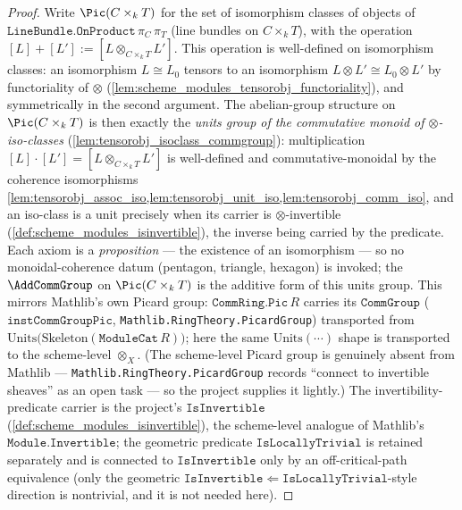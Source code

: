 \begin{proof}
  Write \(\Pic(C \times_k T)\) for the set of isomorphism classes of objects
  of \(\texttt{LineBundle.OnProduct}\,\pi_C\,\pi_T\) (line bundles on
  \(C \times_k T\)), with the operation
  \([L] + [L'] := [L \otimes_{C \times_k T} L']\). This operation is
  well-defined on isomorphism classes: an isomorphism \(L \cong L_0\) tensors
  to an isomorphism \(L \otimes L' \cong L_0 \otimes L'\) by functoriality of
  \(\otimes\) (\cref{lem:scheme_modules_tensorobj_functoriality}), and
  symmetrically in the second argument. The abelian-group structure on
  \(\Pic(C \times_k T)\) is then exactly the \emph{units group of the
  commutative monoid of \(\otimes\)-iso-classes}
  (\cref{lem:tensorobj_isoclass_commgroup}): multiplication
  \([L]\cdot[L'] = [L \otimes_{C\times_k T} L']\) is well-defined and
  commutative-monoidal by the coherence isomorphisms
  \cref{lem:tensorobj_assoc_iso,lem:tensorobj_unit_iso,lem:tensorobj_comm_iso},
  and an iso-class is a unit precisely when its carrier is
  \(\otimes\)-invertible (\cref{def:scheme_modules_isinvertible}), the inverse
  being carried by the predicate. Each axiom is a \emph{proposition} --- the
  existence of an isomorphism --- so no monoidal-coherence datum (pentagon,
  triangle, hexagon) is invoked; the \(\AddCommGroup\) on
  \(\Pic(C \times_k T)\) is the additive form of this units group. This mirrors
  Mathlib's own Picard group: \(\mathtt{CommRing.Pic}\,R\) carries its
  \(\mathtt{CommGroup}\) (\(\mathtt{instCommGroupPic}\),
  \texttt{Mathlib.RingTheory.PicardGroup}) transported from
  \(\mathrm{Units}\bigl(\mathrm{Skeleton}(\mathtt{ModuleCat}\,R)\bigr)\); here
  the same \(\mathrm{Units}(\cdots)\) shape is transported to the scheme-level
  \(\otimes_X\). (The scheme-level Picard group is genuinely absent from
  Mathlib --- \texttt{Mathlib.RingTheory.PicardGroup} records ``connect to
  invertible sheaves'' as an open task --- so the project supplies it lightly.)
  The invertibility-predicate carrier is the project's \(\mathtt{IsInvertible}\)
  (\cref{def:scheme_modules_isinvertible}), the scheme-level analogue of
  Mathlib's \(\mathtt{Module.Invertible}\); the geometric predicate
  \(\mathtt{IsLocallyTrivial}\) is retained separately and is connected to
  \(\mathtt{IsInvertible}\) only by an off-critical-path equivalence (only the
  geometric \(\mathtt{IsInvertible} \Leftarrow \mathtt{IsLocallyTrivial}\)-style
  direction is nontrivial, and it is not needed here).


\end{proof}
